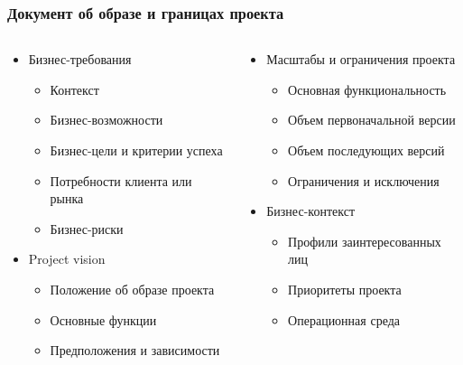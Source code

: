\documentclass{../../slides-style}
\begin{document}
    \begin{frame}
        \frametitle{Документ об образе и границах проекта}
        \begin{columns}
            \begin{column}{0.5\textwidth}
                \begin{itemize}
                    \item Бизнес-требования
                    \begin{itemize}
                        \item Контекст
                        \item Бизнес-возможности
                        \item Бизнес-цели и критерии успеха
                        \item Потребности клиента или рынка
                        \item Бизнес-риски
                    \end{itemize}
                    \item Project vision
                    \begin{itemize}
                        \item Положение об образе проекта
                        \item Основные функции
                        \item Предположения и зависимости
                    \end{itemize}
                \end{itemize}
            \end{column}
            \begin{column}{0.5\textwidth}
                \begin{itemize}
                    \item Масштабы и ограничения проекта
                    \begin{itemize}
                        \item Основная функциональность
                        \item Объем первоначальной версии
                        \item Объем последующих версий
                        \item Ограничения и исключения
                    \end{itemize}
                    \item Бизнес-контекст
                    \begin{itemize}
                        \item Профили заинтересованных лиц
                        \item Приоритеты проекта
                        \item Операционная среда
                    \end{itemize}
                \end{itemize}
            \end{column}
        \end{columns}
    \end{frame}
\end{document}
